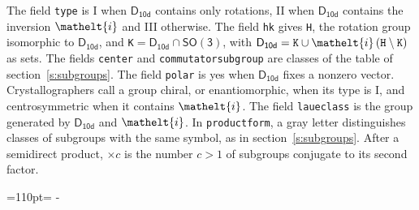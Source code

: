 \documentclass[10pt,a4paper]{article}
\newcommand{\needspace}[1]{\par\penalty-100\begingroup\dimen0=#1\relax\dimen2=\pagegoal
  \advance\dimen2-\pagetotal\ifdim\dimen0>\dimen2\relax\ifdim\dimen2>0pt\vfil\break\fi\fi
  \endgroup}
\numberwithin{equation}{section}
\newcommand{\eltfont}[1]{{\let\sigma\eltsigma\mathelt{#1}}}
\newcommand{\grp}[1]{\mathsf{#1}}
\newcommand{\elt}[1]{\eltfont{#1}}
\begin{document}
\leavevmode\label{n:element.inversion}The field \texttt{type} is I when $\grp{D_{10d}}$ contains only rotations, II when $\grp{D_{10d}}$ contains the inversion $\elt{i}$ and III otherwise. The field \texttt{hk} gives \texttt{H}, the rotation group isomorphic to $\grp{D_{10d}}$, and \texttt{K}${} = \grp{D_{10d}} \cap \grp{SO(3)}$, with $\grp{D_{10d}} = \texttt{K} \cup \elt{i}\,(\texttt{H} \setminus \texttt{K})$ as sets. The fields \texttt{center} and \texttt{commutatorsubgroup} are classes of the table of section~\ref{s:subgroups}. The field \texttt{polar} is yes when $\grp{D_{10d}}$ fixes a nonzero vector. Crystallographers call a group chiral, or enantiomorphic, when its type is I, and centrosymmetric when it contains $\elt{i}$. The field \texttt{laueclass} is the group generated by $\grp{D_{10d}}$ and $\elt{i}$.
In \texttt{productform}, a gray letter distinguishes classes of subgroups with the same symbol, as in section~\ref{s:subgroups}. \label{n:index.conjugates.c}After a semidirect product, ${\times}c$ is the number $c > 1$ of subgroups conjugate to its second factor.
\needspace{110pt}
\end{document}
